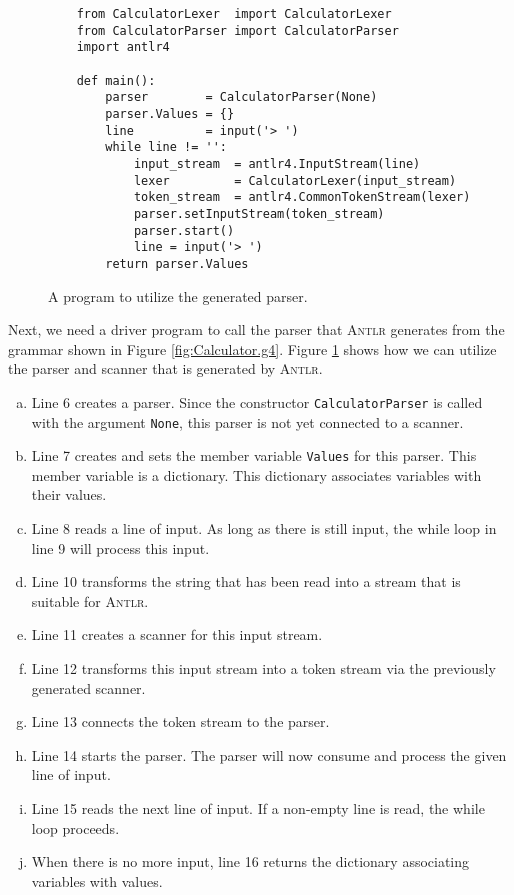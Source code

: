\begin{figure}[!ht]
\centering
\begin{verbatim}
    from CalculatorLexer  import CalculatorLexer
    from CalculatorParser import CalculatorParser
    import antlr4
    
    def main():
        parser        = CalculatorParser(None)
        parser.Values = {}
        line          = input('> ')
        while line != '':
            input_stream  = antlr4.InputStream(line)
            lexer         = CalculatorLexer(input_stream)
            token_stream  = antlr4.CommonTokenStream(lexer)
            parser.setInputStream(token_stream)
            parser.start()
            line = input('> ')
        return parser.Values
\end{verbatim}
\vspace*{-0.3cm}
\caption{A program to utilize the generated parser.}
\label{fig:Calculator.ipynb}
\end{figure}

Next, we need a driver program to call the parser that \textsc{Antlr} generates from the grammar
shown in Figure \ref{fig:Calculator.g4}.  Figure \ref{fig:Calculator.ipynb} shows how we can utilize the parser
and scanner that is generated by \textsc{Antlr}.  
\begin{enumerate}[(a)]
\item Line 6 creates a parser.  Since the constructor \texttt{CalculatorParser} is called with the 
      argument \texttt{None}, this parser is not yet connected to a scanner.
\item Line 7 creates and sets the member variable \texttt{Values} for this parser.
      This member variable is a dictionary.  This dictionary associates variables with their values.
\item Line 8 reads a line of input.  As long as there is still input, the while loop
      in line 9 will process this input.
\item Line 10 transforms the string that has been read into a stream that is suitable for \textsc{Antlr}.
\item Line 11 creates a scanner for this input stream.
\item Line 12 transforms this input stream into a token stream via the previously generated scanner.
\item Line 13 connects the token stream to the parser.
\item Line 14 starts the parser.  The parser will now consume and process the given line of
      input.  
\item Line 15 reads the next line of input.  If a non-empty line is read, the while loop proceeds.
\item When there is no more input, line 16 returns the dictionary associating variables with values. 
\end{enumerate}

